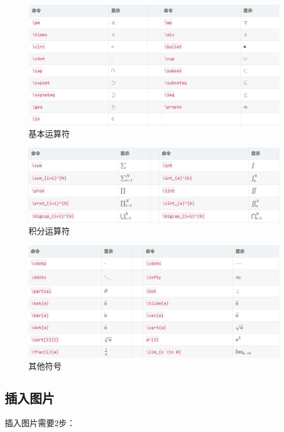 \documentclass{article}
\begin{document}
 \begin{figure}[H]
\centering
\includegraphics[width=1\textwidth]{基本运算符.png}
\caption{基本运算符}
\label{jibenyunsuanfu}
\end{figure}

 \begin{figure}[H]
\centering
\includegraphics[width=1\textwidth]{积分运算符.png}
\caption{积分运算符}
\label{jifen}
\end{figure}

 \begin{figure}[H]
\centering
\includegraphics[width=1\textwidth]{其他符号.png}
\caption{其他符号}
\label{qita}
\end{figure}

\subsection{插入图片}
插入图片需要2步：\\
\end{document}
